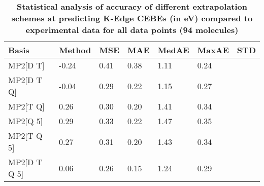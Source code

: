\begin{table}
  \caption{\textbf{Statistical analysis of accuracy of different extrapolation schemes at predicting K-Edge CEBEs (in eV) compared to experimental data for all data points (94 molecules)}}
  \begin{tabular}{l l l l l l l }
    \toprule
    \textbf{Basis} & \textbf{Method} & \textbf{MSE} & \textbf{MAE} & \textbf{MedAE} & \textbf{MaxAE} & \textbf{STD} \\ 
    \midrule
    MP2[D T] & -0.24 & 0.41 & 0.38 & 1.11 & 0.24 \\ 
    MP2[D T Q] & -0.04 & 0.29 & 0.22 & 1.15 & 0.27 \\ 
    MP2[T Q] & 0.26 & 0.30 & 0.20 & 1.41 & 0.34 \\ 
    MP2[Q 5] & 0.29 & 0.33 & 0.22 & 1.47 & 0.35 \\ 
    MP2[T Q 5] & 0.27 & 0.31 & 0.20 & 1.43 & 0.34 \\ 
    MP2[D T Q 5] & 0.06 & 0.26 & 0.15 & 1.24 & 0.29 \\ 
    \bottomrule
  \end{tabular}
\end{table}

